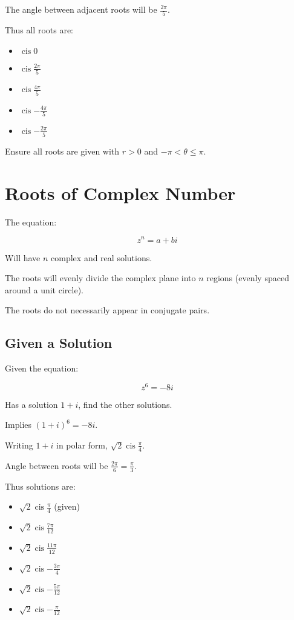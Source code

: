 \documentclass[a4paper,11pt]{article}
\DeclareMathOperator\cis{cis}
\begin{document}
The angle between adjacent roots will be $\frac{2\pi}{5}$.

Thus all roots are:

\begin{itemize}
\item $\cis{0}$
\item $\cis{\frac{2\pi}{5}}$
\item $\cis{\frac{4\pi}{5}}$
\item $\cis{-\frac{4\pi}{5}}$
\item $\cis{-\frac{2\pi}{5}}$
\end{itemize}

Ensure all roots are given with $r > 0$ and $-\pi < \theta \leq \pi$.




\section{Roots of Complex Number}

The equation:

$$
z^n = a + bi
$$

Will have $n$ complex and real solutions.

The roots will evenly divide the complex plane into $n$ regions (evenly spaced
around a unit circle).

The roots do not necessarily appear in conjugate pairs.


\subsection{Given a Solution}

Given the equation:

$$
z^6 = -8i
$$

Has a solution $1 + i$, find the other solutions.

Implies $(1 + i)^6 = -8i$.

Writing $1 + i$ in polar form, $\sqrt{2} \cis{\frac{\pi}{4}}$.

Angle between roots will be $\frac{2\pi}{6} = \frac{\pi}{3}$.

Thus solutions are:

\begin{itemize}
\item $\sqrt{2} \cis{\frac{\pi}{4}}$ (given)
\item $\sqrt{2} \cis{\frac{7\pi}{12}}$
\item $\sqrt{2} \cis{\frac{11\pi}{12}}$
\item $\sqrt{2} \cis{-\frac{3\pi}{4}}$
\item $\sqrt{2} \cis{-\frac{5\pi}{12}}$
\item $\sqrt{2} \cis{-\frac{\pi}{12}}$
\end{itemize}
\end{document}
